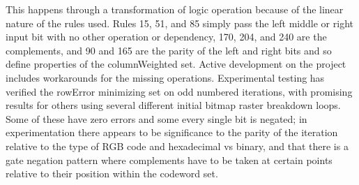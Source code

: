 \documentclass[11pt]{article}
\begin{document}
This happens through a transformation of logic operation because of the linear nature of the rules used. Rules 15, 51, and 85 simply pass the left middle or right input bit with no other operation or dependency, 170, 204, and 240 are the complements, and 90 and 165 are the parity of the left and right bits and so define properties of the columnWeighted set. Active development on the project includes workarounds for the missing operations. Experimental testing has verified the rowError minimizing set on odd numbered iterations, with promising results for others using several different initial bitmap raster breakdown loops. Some of these have zero errors and some every single bit is negated; in experimentation there appears to be  significance to the parity of the iteration relative to the type of RGB code and hexadecimal vs binary, and that there is a gate negation pattern where complements have to be taken at certain points relative to their position within the codeword set.\\
\newpage
\end{document}
